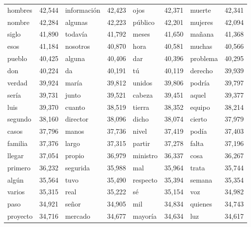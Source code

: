 \begin{table}
\begin{tabular}{|l|l|l|l|l|l|l|l|}
    	    
    	    
   hombres 	&   42,544	   &
   	informaci\'on	&   42,423	  &
  	ojos	&   42,371	  &
   	muerte 	 &  42,341	 \\
  	nombre 	 &  42,284	 &
  	algunas 	&   42,223	  &
  	p\'ublico	&   42,201	   &
  	mujeres 	&   42,094	 \\
  	siglo	  & 41,890	  &
  	todav\'ia	&   41,792	  &
  	meses  	 &  41,650	  &
  	ma\~nana  &	   41,368	   \\
  	esos 	 &  41,184	  &
  	nosotros	&   40,870	 &
  	hora	 &  40,581	   &
  	muchas  &	   40,566	 \\
  	pueblo	 &  40,425	&
  	alguna	 &  40,406	&
  	dar	  & 40,396	  &
  	problema 	&   40,295	   \\
  	don 	&   40,224	   &
  	da	 &  40,191	   &
  	t\'u	&   40,119	   &
  	derecho 	&   39,939	 \\
  	verdad	&   39,924	&
  	mar\'ia	 &  39,812	   &
  	unidos	 &  39,806	&
  	podr\'ia	&   39,797	   \\
  	ser\'ia	 &  39,731	   &
  	junto	 &  39,521	 &
  	cabeza 	&   39,451	  &
  	aquel	&   39,377	   \\
  	luis	&   39,370	   &
  	cuanto 	&   38,519	   &
  	tierra	&   38,352	   &
  	equipo	&   38,214	 \\
  	segundo & 	   38,160	 &
  	director &	   38,096	 &
  	dicho	&   38,074	   &
  	cierto	&   37,979 \\
  	casos 	&   37,796 &
  	manos  	&   37,736 &
  	nivel	&   37,419	   &
  	pod\'ia	&   37,403 \\
  	familia	&   37,376 &
  	largo	&   37,315	   &
  	partir	&   37,278	   &
  	falta	&   37,196	   \\
  	llegar	&   37,054	  &
  	propio	&   36,979	  &
  	ministro	&   36,337	  &
  	cosa 	&   36,267	  \\
  	primero	&   36,232	  &
  	segurida &   35,988	  &
  	mal &	   35,964	  &
  	trata &	   35,744	   \\
  	alg\'un	&   35,564	&
  	tuvo	&   35,490	  &
  	respecto	&   35,394 &
  	semana  &	   35,354 \\
  	varios	&   35,315 &
   real	&   35,222	   &
   s\'e	&   35,154	   &
   voz	&   34,982	   \\
   paso &	   34,921	   &
   se\~nor	&   34,905	   &
   mil	&   34,834	   &
   quienes &	   34,743	   \\
   proyecto	&   34,716	   &
   mercado 	&   34,677	   &
   mayor\'ia &	   34,634	   &
   luz	&   34,617	   \\

\end{tabular}
\end{table}
